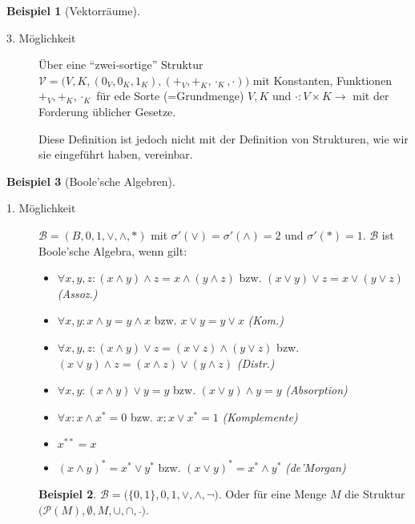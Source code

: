 \documentclass{article}
\theoremstyle{definition}
\newtheorem*{bsp}{Beispiel}
\theoremstyle{plain}
\newcommand{\m}[1]{\mathcal{#1}}
\begin{document}
\begin{bsp}[Vektorräume]
\begin{description}
            \item[3. Möglichkeit]
            Über eine ``zwei-sortige'' Struktur $ \m{V} = \big(V, K, (0_V, 0_K, 1_K), (+_V, +_K, \cdot_K, \cdot)\big) $ mit Konstanten, Funktionen $ +_V, +_K, \cdot_K $ für ede Sorte (=Grundmenge) $ V, K $ und $ \cdot : V \times K \rightarrow $ mit der Forderung üblicher Gesetze.

            Diese Definition ist jedoch nicht mit der Definition von Strukturen, wie wir sie eingeführt haben, vereinbar.
        \end{description}
    \end{bsp}

    \begin{bsp}[Boole'sche Algebren]
        ~\par
        \begin{description}
            \item[1. Möglichkeit]
            \label{itm:boolesche-algebra-struktur}
            $ \m{B}= (B, 0, 1, \lor, \land, *) $ mit $ \sigma'(\lor) = \sigma'(\land) = 2 $ und $ \sigma'(*) = 1 $.
            $ \m{B} $ ist Boole'sche Algebra, wenn gilt:
            \begin{itemize}
                \item $ \forall x, y, z: (x \land y) \land z = x \land (y \land z) $ bzw. $ (x \lor y) \lor z = x \lor (y \lor z) $ \hfill \textit{(Assoz.)}
                \item $ \forall x, y: x \land y = y \land x $ bzw. $ x \lor y = y \lor x $ \hfill \textit{(Kom.)}
                \item $ \forall x, y, z: (x \land y) \lor z = (x \lor z) \land (y \lor z) $ bzw. $ (x \lor y) \land z = (x \land z) \lor (y \land z) $ \hfill \textit{(Distr.)}
                \item $ \forall x, y: (x \land y) \lor y = y $ bzw. $ (x \lor y) \land y = y $ \hfill \textit{(Absorption)}
                \item $ \forall x: x \land x^* = 0 $ bzw. $ x: x \lor x^* = 1 $ \hfill \textit{(Komplemente)}
                \item $ x^{**} = x $
                \item $ (x \land y)^* = x^* \lor y^* $ bzw. $ (x \lor y)^* = x^* \land y^* $ \hfill \textit{(de'Morgan)}
            \end{itemize}
            \begin{bsp}
                $ \m{B} = \big(\{0, 1\}, 0, 1, \lor, \land, \neg\big) $.
                Oder für eine Menge $ M $ die Struktur $ \big(\m{P}(M), \emptyset, M, \cup, \cap, \bar\; \big) $.
            \end{bsp}


\end{description}
\end{bsp}
\end{document}
